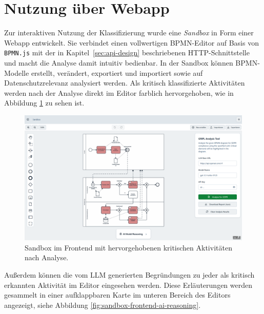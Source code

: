 \section{Nutzung über Webapp}\label{sec:nutzung-uber-webapp}

Zur interaktiven Nutzung der Klassifizierung wurde eine \emph{Sandbox} in Form einer Webapp entwickelt. Sie verbindet einen vollwertigen \ac{BPMN}-Editor auf Basis von \texttt{BPMN.js} \cite{bpmn-js} mit der in Kapitel~\ref{sec:api-design} beschriebenen HTTP-Schnittstelle und macht die Analyse damit intuitiv bedienbar. In der Sandbox können \ac{BPMN}-Modelle erstellt, verändert, exportiert und importiert sowie auf Datenschutzrelevanz analysiert werden. Als kritisch klassifizierte Aktivitäten werden nach der Analyse direkt im Editor farblich hervorgehoben, wie in Abbildung \ref{fig:sandbox-frontend-analyzed-model} zu sehen ist.

\begin{figure}
    \centering
    \includegraphics[width=\linewidth]{images/sandbox/sandbox-analyzed-model}
    \caption{Sandbox im Frontend mit hervorgehobenen kritischen Aktivitäten nach Analyse.}
    \label{fig:sandbox-frontend-analyzed-model}
\end{figure}

Außerdem können die vom \ac{LLM} generierten Begründungen zu jeder als kritisch erkannten Aktivität im Editor eingesehen werden. Diese Erläuterungen werden gesammelt in einer aufklappbaren Karte im unteren Bereich des Editors angezeigt, siehe Abbildung \ref{fig:sandbox-frontend-ai-reasoning}.

